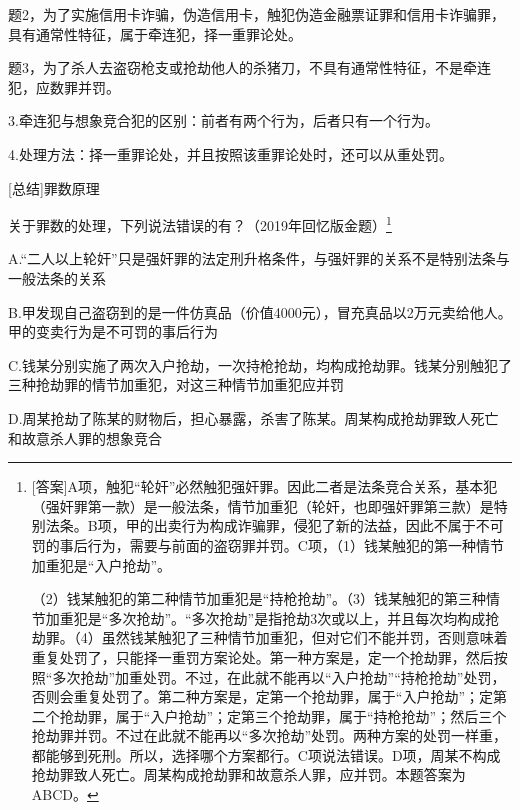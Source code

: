 题2，为了实施信用卡诈骗，伪造信用卡，触犯伪造金融票证罪和信用卡诈骗罪，具有通常性特征，属于牵连犯，择一重罪论处。

题3，为了杀人去盗窃枪支或抢劫他人的杀猪刀，不具有通常性特征，不是牵连犯，应数罪并罚。

3.牵连犯与想象竞合犯的区别：前者有两个行为，后者只有一个行为。

4.处理方法：择一重罪论处，并且按照该重罪论处时，还可以从重处罚。

[总结]罪数原理




关于罪数的处理，下列说法错误的有？（2019年回忆版金题）\footnote{[答案]A项，触犯“轮奸”必然触犯强奸罪。因此二者是法条竞合关系，基本犯（强奸罪第一款）是一般法条，情节加重犯（轮奸，也即强奸罪第三款）是特别法条。B项，甲的出卖行为构成诈骗罪，侵犯了新的法益，因此不属于不可罚的事后行为，需要与前面的盗窃罪并罚。C项，（1）钱某触犯的第一种情节加重犯是“入户抢劫”。

（2）钱某触犯的第二种情节加重犯是“持枪抢劫”。（3）钱某触犯的第三种情节加重犯是“多次抢劫”。“多次抢劫”是指抢劫3次或以上，并且每次均构成抢劫罪。（4）虽然钱某触犯了三种情节加重犯，但对它们不能并罚，否则意味着重复处罚了，只能择一重罚方案论处。第一种方案是，定一个抢劫罪，然后按照“多次抢劫”加重处罚。不过，在此就不能再以“入户抢劫”“持枪抢劫”处罚，否则会重复处罚了。第二种方案是，定第一个抢劫罪，属于“入户抢劫”；定第二个抢劫罪，属于“入户抢劫”；定第三个抢劫罪，属于“持枪抢劫”；然后三个抢劫罪并罚。不过在此就不能再以“多次抢劫”处罚。两种方案的处罚一样重，都能够到死刑。所以，选择哪个方案都行。C项说法错误。D项，周某不构成抢劫罪致人死亡。周某构成抢劫罪和故意杀人罪，应并罚。本题答案为ABCD。}

A.“二人以上轮奸”只是强奸罪的法定刑升格条件，与强奸罪的关系不是特别法条与一般法条的关系

B.甲发现自己盗窃到的是一件仿真品（价值4000元），冒充真品以2万元卖给他人。甲的变卖行为是不可罚的事后行为

C.钱某分别实施了两次入户抢劫，一次持枪抢劫，均构成抢劫罪。钱某分别触犯了三种抢劫罪的情节加重犯，对这三种情节加重犯应并罚

D.周某抢劫了陈某的财物后，担心暴露，杀害了陈某。周某构成抢劫罪致人死亡和故意杀人罪的想象竞合


